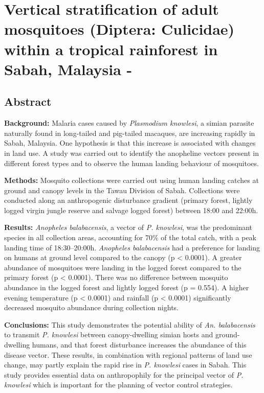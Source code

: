 \section*{Vertical stratification of adult mosquitoes (Diptera: Culicidae) within a tropical rainforest in Sabah, Malaysia \citep{Brant2016} - \textit{}}

\subsection*{Abstract}
\textbf{Background:} Malaria cases caused by \textit{Plasmodium knowlesi}, a simian parasite naturally found in long-tailed and pig-tailed macaques, are increasing rapidly in Sabah, Malaysia. One hypothesis is that this increase is associated with changes in land use. A study was carried out to identify the anopheline vectors present in different forest types and to observe the human landing behaviour of mosquitoes. 

\textbf{Methods:} Mosquito collections were carried out using human landing catches at ground and canopy levels in the Tawau Division of Sabah. Collections were conducted along an anthropogenic disturbance gradient (primary forest, lightly logged virgin jungle reserve and salvage logged forest) between 18:00 and 22:00h.

\textbf{Results:} \textit{Anopheles balabacensis}, a vector of \textit{P. knowlesi}, was the predominant species in all collection areas, accounting for 70\% of the total catch, with a peak landing time of 18:30–20:00h. \textit{Anopheles balabacensis} had a preference for landing on humans at ground level compared to the canopy (p < 0.0001). A greater abundance of mosquitoes were landing in the logged forest compared to the primary forest (p < 0.0001). There was no difference between mosquito abundance in the logged forest and lightly logged forest (p = 0.554). A higher evening temperature (p < 0.0001) and rainfall (p < 0.0001) significantly decreased mosquito abundance during collection nights.

\textbf{Conclusions:} This study demonstrates the potential ability of \textit{An. balabacensis} to transmit \textit{P. knowlesi} between canopy-dwelling simian hosts and ground-dwelling humans, and that forest disturbance increases the abundance of this disease vector. These results, in combination with regional patterns of land use change, may partly explain the rapid rise in \textit{P. knowlesi} cases in Sabah. This study provides essential data on anthropophily for the principal vector of \textit{P. knowlesi} which is important for the planning of vector control strategies.


